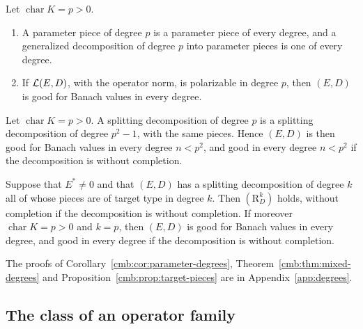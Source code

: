 \begin{corollary}\label{cmb:cor:parameter-degrees}
Let $\operatorname{char}K=p>0$.
\begin{enumerate}
\item A parameter piece of degree $p$ is a parameter piece of every degree, and a generalized decomposition of degree $p$
into parameter pieces is one of every degree.
\item If $\mathcal L(E,D)$, with the operator norm, is polarizable in degree $p$, then $(E,D)$ is good for Banach values in every
degree.
\end{enumerate}
\end{corollary}

\begin{theorem}\label{cmb:thm:mixed-degrees}
Let $\operatorname{char}K=p>0$. A splitting decomposition of degree $p$ is a splitting decomposition of degree $p^2-1$, with
the same pieces. Hence $(E,D)$ is then good for Banach values in every degree $n<p^2$, and good in every degree $n<p^2$ if
the decomposition is without completion.
\end{theorem}

\begin{proposition}\label{cmb:prop:target-pieces}
Suppose that $E^*\ne0$ and that $(E,D)$ has a splitting decomposition of degree $k$ all of whose pieces are of target type
in degree $k$. Then $(\mathrm R^k_D)$ holds, without completion if the decomposition is without completion. If moreover
$\operatorname{char}K=p>0$ and $k=p$, then $(E,D)$ is good for Banach values in every degree, and good in every degree if
the decomposition is without completion.
\end{proposition}

The proofs of Corollary~\ref{cmb:cor:parameter-degrees}, Theorem~\ref{cmb:thm:mixed-degrees} and
Proposition~\ref{cmb:prop:target-pieces} are in Appendix~\ref{app:degrees}.

\subsection{The class of an operator family}\label{cmb:ssec:families}

